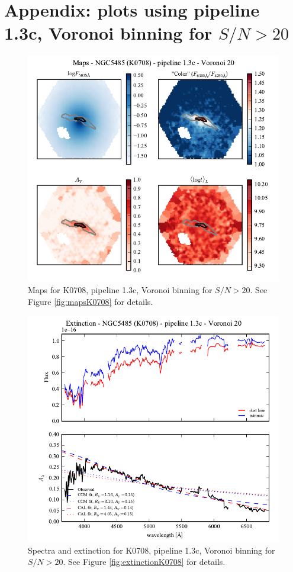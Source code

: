\documentclass[a4paper]{article}
\begin{document}
\appendix

\section{Appendix: plots using pipeline 1.3c, Voronoi binning for $S/N > 20$}
\label{sec:app13c}

\begin{figure}[H]
\includegraphics{figures/maps_K0708_1.3c_v20.pdf}
\caption{Maps for K0708, pipeline 1.3c, Voronoi binning for $S/N > 20$. See
Figure \ref{fig:mapsK0708} for details.}
\label{fig:maps_K0708_13c_v20}
\end{figure}

\begin{figure}[H]
\includegraphics{figures/spectra_K0708_1.3c_v20.pdf}
\caption{Spectra and extinction for K0708, pipeline 1.3c, Voronoi binning for
$S/N > 20$. See Figure \ref{fig:extinctionK0708} for details.}
\end{figure}
\end{document}
